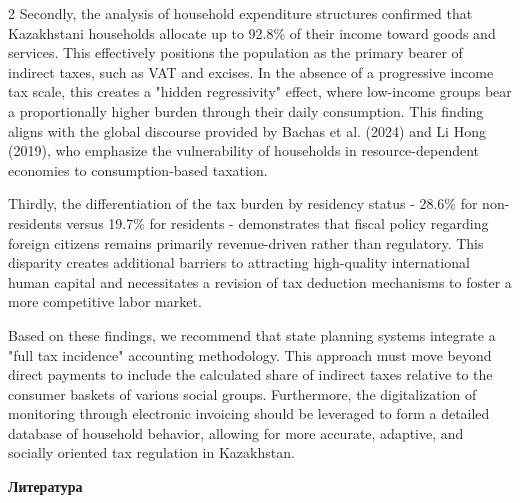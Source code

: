 \begin{multicols}{2}
Secondly, the analysis of household expenditure structures confirmed
that Kazakhstani households allocate up to 92.8\% of their income toward
goods and services. This effectively positions the population as the
primary bearer of indirect taxes, such as VAT and excises. In the
absence of a progressive income tax scale, this creates a "hidden
regressivity" effect, where low-income groups bear a proportionally
higher burden through their daily consumption. This finding aligns with
the global discourse provided by Bachas et al. (2024) and Li Hong
(2019), who emphasize the vulnerability of households in
resource-dependent economies to consumption-based taxation.

Thirdly, the differentiation of the tax burden by residency status -
28.6\% for non-residents versus 19.7\% for residents - demonstrates that
fiscal policy regarding foreign citizens remains primarily
revenue-driven rather than regulatory. This disparity creates additional
barriers to attracting high-quality international human capital and
necessitates a revision of tax deduction mechanisms to foster a more
competitive labor market.

Based on these findings, we recommend that state planning systems
integrate a "full tax incidence" accounting methodology. This approach
must move beyond direct payments to include the calculated share of
indirect taxes relative to the consumer baskets of various social
groups. Furthermore, the digitalization of monitoring through electronic
invoicing should be leveraged to form a detailed database of household
behavior, allowing for more accurate, adaptive, and socially oriented
tax regulation in Kazakhstan.
\end{multicols}

\begin{center}
{\bfseries Литература}
\end{center}

